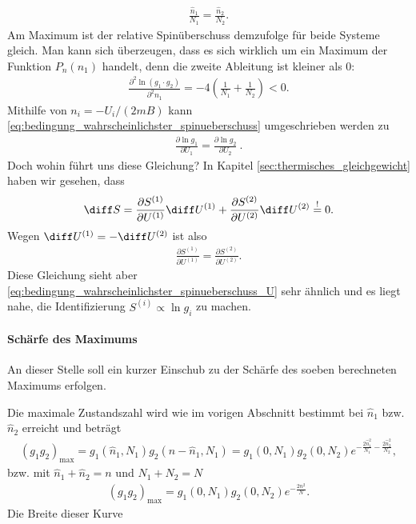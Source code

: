 \begin{align*}
    \frac{\hat{n}_1}{N_1} = \frac{\hat{n}_2}{N_2} . 
\end{align*}
Am Maximum ist der relative Spinüberschuss demzufolge für beide Systeme gleich. Man kann sich überzeugen, dass es sich wirklich um ein Maximum der Funktion $P_n(n_1)$ handelt, denn die zweite Ableitung ist kleiner als $0$:
\begin{align*}
    \frac{\partial ^2\ln(g_1\cdot g_2)}{\partial ^2n_1} = -4\left( \frac{1}{N_1}+\frac{1}{N_2} \right) < 0.
\end{align*}
Mithilfe von $n_i= -U_i/(2mB)$ kann \eqref{eq:bedingung_wahrscheinlichster_spinueberschuss} umgeschrieben werden zu
\begin{align}
    \label{eq:bedingung_wahrscheinlichster_spinueberschuss_U}
    \boxed{\frac{\partial \ln g_1}{\partial U_1}  = \frac{\partial \ln g_2}{\partial U_2} }\:.
\end{align}
Doch wohin führt uns diese Gleichung? In Kapitel \ref{sec:thermisches_gleichgewicht} haben wir gesehen, dass 
\begin{align*}
    \diff S = \frac{\partial S^{(1)}}{\partial U^{(1)}}\diff U^{(1)}+ \frac{\partial S^{(2)}}{\partial U^{(2)}}\diff U^{(2)} \overset{!}{=}0. 
\end{align*}
Wegen $\diff U^{(1)} = -\diff U^{(2)}$ ist also 
\begin{align*}
    \frac{\partial S^{(1)}}{\partial U^{(1)}} = \frac{\partial S^{(2)}}{\partial U^{(2)}}. 
\end{align*}
Diese Gleichung sieht aber \eqref{eq:bedingung_wahrscheinlichster_spinueberschuss_U} sehr ähnlich und es liegt nahe, die Identifizierung $S^{(i)}\propto \ln g_i$ zu machen. 


\paragraph*{Schärfe des Maximums}

An dieser Stelle soll ein kurzer Einschub zu der Schärfe des soeben berechneten Maximums erfolgen. 

Die maximale Zustandszahl wird wie im vorigen Abschnitt bestimmt bei $\hat{n}_1$ bzw. $\hat{n}_2$ erreicht und beträgt 
\begin{align*}
    (g_1g_2)_\mathrm{max} = g_1(\hat{n}_1,N_1)g_2(n-\hat{n}_1,N_1) = g_1(0,N_1)g_2(0,N_2) e^{-\frac{2\hat{n}_1^2}{N_1}-\frac{2\hat{n}_2^2}{N_2}},
\end{align*}
bzw. mit $\hat{n}_1+\hat{n}_2=n$ und $N_1+N_2=N$
\begin{align*}
    (g_1g_2)_\mathrm{max} = g_1(0,N_1)g_2(0,N_2) e^{-\frac{2n^2}{N}}. 
\end{align*}
Die Breite dieser Kurve %